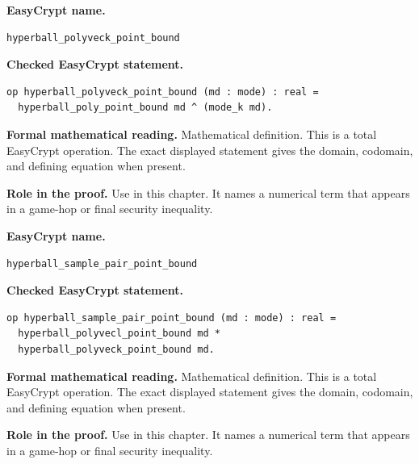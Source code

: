\begin{formaldefinition}
\noindent\textbf{EasyCrypt name.}
\begin{lstlisting}[language=EasyCrypt,basicstyle=\ttfamily\scriptsize]
hyperball_polyveck_point_bound
\end{lstlisting}
\noindent\textbf{Checked EasyCrypt statement.}
\begin{lstlisting}[language=EasyCrypt,basicstyle=\ttfamily\scriptsize]
op hyperball_polyveck_point_bound (md : mode) : real =
  hyperball_poly_point_bound md ^ (mode_k md).
\end{lstlisting}
\noindent\textbf{Formal mathematical reading.}
Mathematical definition. This is a total EasyCrypt operation.  The exact displayed statement gives the domain, codomain, and defining equation when present.

\noindent\textbf{Role in the proof.}
Use in this chapter. It names a numerical term that appears in a game-hop or final security inequality.

\end{formaldefinition}

\begin{formaldefinition}
\noindent\textbf{EasyCrypt name.}
\begin{lstlisting}[language=EasyCrypt,basicstyle=\ttfamily\scriptsize]
hyperball_sample_pair_point_bound
\end{lstlisting}
\noindent\textbf{Checked EasyCrypt statement.}
\begin{lstlisting}[language=EasyCrypt,basicstyle=\ttfamily\scriptsize]
op hyperball_sample_pair_point_bound (md : mode) : real =
  hyperball_polyvecl_point_bound md *
  hyperball_polyveck_point_bound md.
\end{lstlisting}
\noindent\textbf{Formal mathematical reading.}
Mathematical definition. This is a total EasyCrypt operation.  The exact displayed statement gives the domain, codomain, and defining equation when present.

\noindent\textbf{Role in the proof.}
Use in this chapter. It names a numerical term that appears in a game-hop or final security inequality.

\end{formaldefinition}

